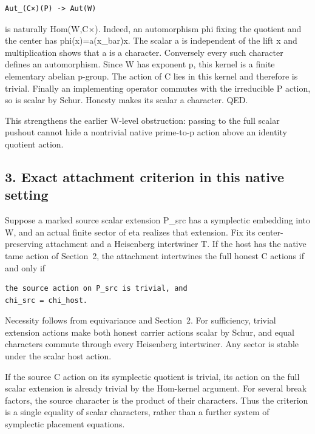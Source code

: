 \begin{Verbatim}[fontsize=\small,breaklines=true,breakanywhere=true]
Aut_(C×)(P) -> Aut(W)
\end{Verbatim}

is naturally Hom(W,C×). Indeed, an automorphism phi fixing the quotient
and the center has phi(x)=a(x\_bar)x. The scalar a is independent of the
lift x and multiplication shows that a is a character. Conversely every
such character defines an automorphism. Since W has exponent p, this
kernel is a finite elementary abelian p-group. The action of C lies in
this kernel and therefore is trivial. Finally an implementing operator
commutes with the irreducible P action, so is scalar by Schur. Honesty
makes its scalar a character. QED.

This strengthens the earlier W-level obstruction: passing to the full
scalar pushout cannot hide a nontrivial native prime-to-p action above
an identity quotient action.

\hypertarget{stabilizer_contract-exact-attachment-criterion-in-this-native-setting}{%
\subsection{3. Exact attachment criterion in this native
setting}\label{stabilizer_contract-exact-attachment-criterion-in-this-native-setting}}

Suppose a marked source scalar extension P\_src has a symplectic
embedding into W, and an actual finite sector of eta realizes that
extension. Fix its center-preserving attachment and a Heisenberg
intertwiner T. If the host has the native tame action of Section~2, the
attachment intertwines the full honest C actions if and only if

\begin{Verbatim}[fontsize=\small,breaklines=true,breakanywhere=true]
the source action on P_src is trivial, and
chi_src = chi_host.
\end{Verbatim}

Necessity follows from equivariance and Section~2. For sufficiency,
trivial extension actions make both honest carrier actions scalar by
Schur, and equal characters commute through every Heisenberg
intertwiner. Any sector is stable under the scalar host action.

If the source C action on its symplectic quotient is trivial, its action
on the full scalar extension is already trivial by the Hom-kernel
argument. For several break factors, the source character is the product
of their characters. Thus the criterion is a single equality of scalar characters, rather than a further system of symplectic placement
equations.


